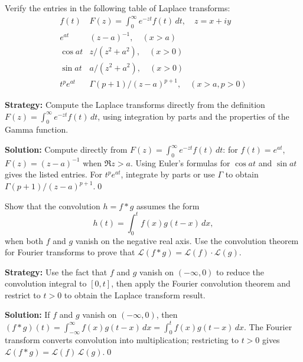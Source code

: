 \begin{problembox}
\begin{problemstatement}
Verify the entries in the following table of Laplace transforms:
\[
\begin{array}{ll}
f(t) & F(z) = \int_0^\infty e^{-zt} f(t) \, dt, \quad z = x + iy \\
e^{at} & (z - a)^{-1}, \quad (x > a) \\
\cos at & z/(z^2 + a^2), \quad (x > 0) \\
\sin at & a/(z^2 + a^2), \quad (x > 0) \\
t^p e^{at} & \Gamma(p + 1)/(z - a)^{p+1}, \quad (x > a, p > 0)
\end{array}
\]
\end{problemstatement}
\end{problembox}

\noindent\textbf{Strategy:} Compute the Laplace transforms directly from the definition $F(z)=\int_0^\infty e^{-zt}f(t)\,dt$, using integration by parts and the properties of the Gamma function.

\bigskip\noindent\textbf{Solution:}
Compute directly from $F(z)=\int_0^{\infty} e^{-zt} f(t)\,dt$: for $f(t)=e^{at}$, $F(z)=(z-a)^{-1}$ when $\Re z>a$. Using Euler's formulas for $\cos at$ and $\sin at$ gives the listed entries. For $t^p e^{at}$, integrate by parts or use $\Gamma$ to obtain $\Gamma(p+1)/(z-a)^{p+1}$.\qed


\begin{problembox}
\begin{problemstatement}
Show that the convolution $h = f * g$ assumes the form
\[
h(t) = \int_0^t f(x) g(t - x) \, dx,
\]
when both $f$ and $g$ vanish on the negative real axis. Use the convolution theorem for Fourier transforms to prove that $\mathcal{L}(f * g) = \mathcal{L}(f) \cdot \mathcal{L}(g)$.
\end{problemstatement}
\end{problembox}

\noindent\textbf{Strategy:} Use the fact that $f$ and $g$ vanish on $(-\infty,0)$ to reduce the convolution integral to $[0,t]$, then apply the Fourier convolution theorem and restrict to $t>0$ to obtain the Laplace transform result.

\bigskip\noindent\textbf{Solution:}
If $f$ and $g$ vanish on $(-\infty,0)$, then $(f*g)(t)=\int_{-\infty}^{\infty} f(x)g(t-x)\,dx=\int_0^t f(x)g(t-x)\,dx$. The Fourier transform converts convolution into multiplication; restricting to $t>0$ gives $\mathcal L(f*g)=\mathcal L(f)\,\mathcal L(g)$.\qed


